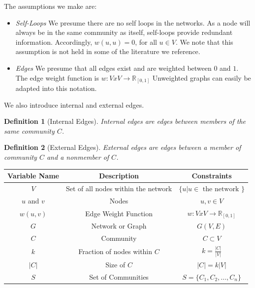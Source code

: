 \documentclass[phd,tocprelim]{cornell}
\newtheorem{definition}{Definition}
\renewcommand{\caption}[1]{\singlespacing\hangcaption{#1}\normalspacing}
\begin{document}
The assumptions we make are:
\begin{itemize}
\item {\it Self-Loops}  We presume there are no self loops in the networks.  As a node will always be in the same community as itself, self-loops provide redundant information.  Accordingly, $w(u, u) = 0$, for all $u \in V$.  We note that this assumption is not held in some of the literature we reference.
\item {\it Edges} We presume that all edges exist and are weighted between $0$ and $1$.  The edge weight function is $w : VxV \rightarrow \mathbb{R}_{[0, 1]}$  Unweighted graphs can easily be adapted into this notation.
\end{itemize}

We also introduce internal and external edges.
\begin{definition}[Internal Edges]
Internal edges are edges between members of the same community $C$.
\end{definition}
\begin{definition}[External Edges]
External edges are edges between a member of community $C$ and a nonmember of $C$.
\end{definition}

\begin{table}
\caption{Notation}
\begin{center}
\begin{tabular}{|c|c|c|} \hline
Variable Name & Description & Constraints \\ \hline
$V$ & Set of all nodes within the network & $\{u | u \in \mbox{ the network }\}$\\ \hline
$u$ and $v$ & Nodes & $u, v \in V$ \\ \hline
$w(u,v)$ & Edge Weight Function &  $w:VxV \rightarrow \mathbb{R} _{[0, 1]}$ \\ \hline
$G$ & Network or Graph & $G(V,E)$ \\ \hline
$C$ & Community & $C \subset V$ \\ \hline
$k$ & Fraction of nodes within $C$ & $k = \frac{|C|}{|V|}$ \\ \hline
$|C|$ & Size of $C$ & $|C| = k|V |$ \\ \hline
$S$ & Set of Communities & $S = \{C_1,C_2,\dots,C_n\}$\\ \hline
\end{tabular}
\end{center}
\label{table_variables}
\end{table}
\end{document}
